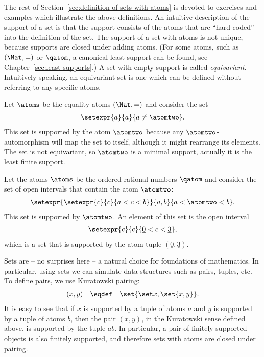 The rest of Section~\ref{sec:definition-of-sets-with-atoms} is devoted to exercises and examples which illustrate the above definitions. 
An intuitive description of the support of a set is that the support consists of the atoms that are ``hard-coded'' into the definition of the set.
The support of a set with atoms is not unique, because supports are closed under adding atoms. (For some atoms, such as $(\Nat,=)$ or $\qatom$, a canonical least support can be found, see Chapter~\ref{sec:least-supports}.) A set with empty support is called \emph{equivariant}. Intuitively speaking, an equivariant set is one which can be defined without referring to any specific atoms.



\begin{myexample}\label{ex:cofinite-set}
	Let $\atoms$ be the equality atoms $(\Nat, =)$ and consider the set
	\begin{align*}
		\setexpr{ a} {a} { a \neq \atomtwo}.
	\end{align*}
	This set is supported by the atom $\atomtwo$ because any $\atomtwo$-automorphism will map the set to itself, although it might rearrange its elements. The set is not equivariant, so $ \atomtwo$ is a minimal support, actually it is the least finite support.
\end{myexample}

\begin{myexample}
	Let the atoms $\atoms$ be the ordered rational numbers $\qatom$ and consider the set of open intervals that contain the atom $\atomtwo$:
	\begin{align*}
		\setexpr { \setexpr{ c} {c} {a < c < b}} {a,b
		} {a < \atomtwo < b}.
	\end{align*}
	This set is supported by $\atomtwo$. An element of this set is the open interval
	\begin{align*}
		\setexpr{ c} {c} {\underline 0 < c < \underline 3},
	\end{align*}
	which is a set that is supported by the atom tuple $(\underline 0, \underline 3)$.
\end{myexample}


Sets are -- no surprises here -- a natural choice for foundations of mathematics. In particular, using sets we can simulate data structures such as pairs, tuples, etc. To define pairs, we use Kuratowski pairing:
\begin{align*}
	(x,y) \quad \eqdef \quad \set{ \set x, \set{x,y}}.
\end{align*}
It is easy to see that if $x$ is supported by a tuple of atoms $\bar a$ and $y$ is supported by a tuple of atoms $\bar b$, then the pair $(x,y)$, in the Kuratowski sense defined above, is supported by the tuple $\bar a \bar b$. In particular, a pair of finitely supported objects is also finitely supported, and therefore sets with atoms are closed under pairing. 

